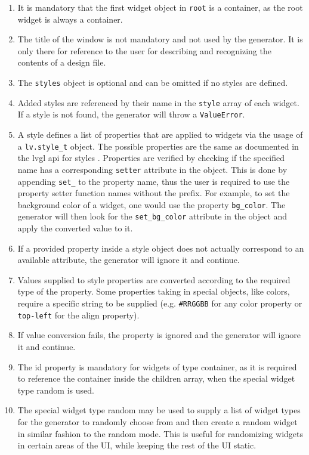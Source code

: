 \documentclass[Bachelor, BIC, english, fhCitStyle, IEEE]{BASE/twbook} %
\def\code#1{\texttt{#1}}
\begin{document}
\begin{enumerate}
    \item It is mandatory that the first widget object in \code{root} is a container, as the root widget is always a container.
    \item The title of the window is not mandatory and not used by the generator. It is only there for reference to the user for describing and recognizing the contents of a design file.
    \item The \code{styles} object is optional and can be omitted if no styles are defined.
    \item Added styles are referenced by their name in the \code{style} array of each widget. If a style is not found, the generator will throw a \code{ValueError}.
    \item A style defines a list of properties that are applied to widgets via the usage of a \code{lv.style\_t} object. The possible properties are the same as documented in the \ac{lvgl} \ac{api} for styles \autocite{Lv_style_genLVGLDocumentation}.
Properties are verified by checking if the specified name has a corresponding \code{setter} attribute in the object. This is done by appending \code{set\_} to the property name, thus the user is required to use the property setter function names without the prefix. For example, to set the background color of a widget, one would use the property \code{bg\_color}. The generator will then look for the \code{set\_bg\_color} attribute in the object and apply the converted value to it.
    \item If a provided property inside a style object does not actually correspond to an available attribute, the generator will ignore it and continue.
    \item Values supplied to style properties are converted according to the required type of the property. Some properties taking in special objects, like colors, require a specific string to be supplied (e.g. \code{\#RRGGBB} for any color property or \code{top-left} for the align property).
    \item If value conversion fails, the property is ignored and the generator will ignore it and continue.
    \item The id property is mandatory for widgets of type container, as it is required to reference the container inside the children array, when the special widget type random is used.
    \item The special widget type random may be used to supply a list of widget types for the generator to randomly choose from and then create a random widget in similar fashion to the random mode. This is useful for randomizing widgets in certain areas of the UI, while keeping the rest of the UI static.
\end{enumerate}
\newpage
\end{document}
